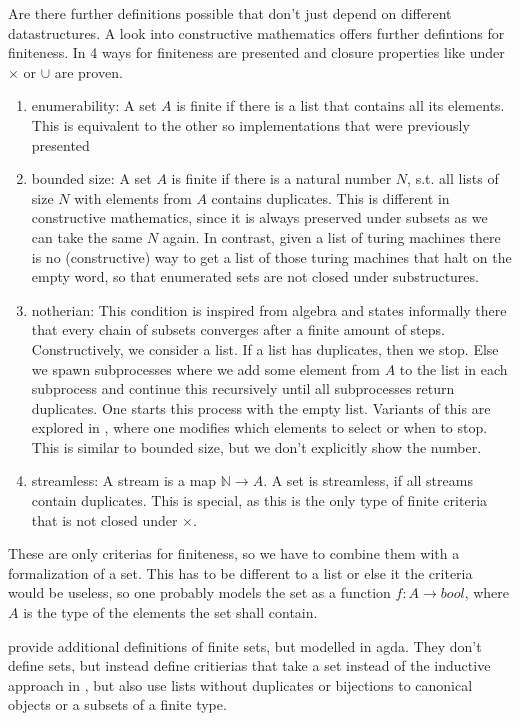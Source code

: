 \documentclass{article}
\begin{document}
 Are there further definitions possible that don't just depend on different datastructures. A look into constructive mathematics offers further defintions for finiteness.
In \cite{Constructive} 4 ways for finiteness are presented and closure properties like under $\times$ or $\cup$ are proven.
\begin{enumerate}
\item enumerability: A set $A$ is finite if there is a list that contains all its elements. This is equivalent to the other so implementations that were previously presented
\item bounded size:  A set $A $ is finite if there is a natural number $N$, s.t. all lists of size $N$ with elements from $A$ contains duplicates. This is different in constructive mathematics, since it is always preserved under subsets as we can take the same $N$ again. In contrast, given a list of turing machines there is no (constructive) way to get a list of those turing machines that halt on the empty word, so that enumerated sets are not closed under substructures.
\item notherian: This condition is inspired from algebra and states informally there that every chain of subsets converges after a finite amount of steps. Constructively, we consider a list. If a list has duplicates, then we stop. Else we spawn subprocesses where we add some element from $A$ to the list in each subprocess and continue this recursively until all subprocesses return duplicates. One starts this process with the empty list. Variants of this are explored in \cite{noetherian}, where one modifies which elements to select or when to stop. This is similar to bounded size, but we don't explicitly show the number.
\item streamless: A stream is a map $\mathbb{N} \to A$. A set is streamless, if all streams contain duplicates. This is special, as this is the only type of finite criteria that is not closed under $\times$.
\end{enumerate}

These are only criterias for finiteness, so we have to combine them with a formalization of a set. This has to be different to a list or else it the criteria would be useless, so one probably models the set as a function $f: A \to bool$, where $A$ is the type of the elements the set shall contain.

\cite{finsetAgda} provide additional definitions of finite sets, but modelled in agda. They don't define sets, but instead define critierias that take a set instead of the inductive approach in \cite{HoTT-FinSets}, but also use lists without duplicates or bijections to canonical objects or a subsets of a finite type.
\end{document}
